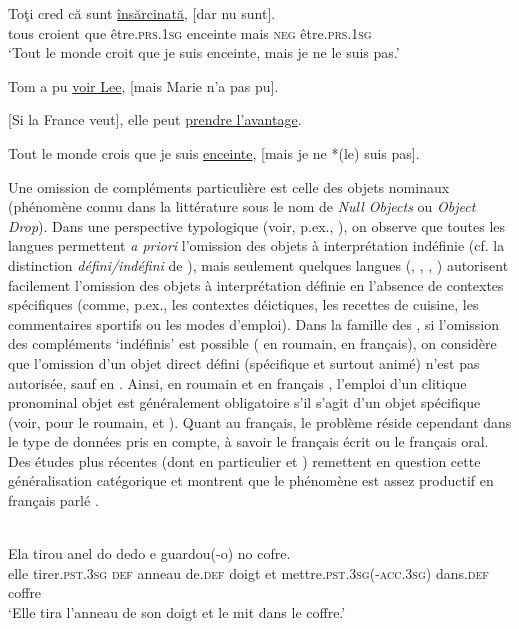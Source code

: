 \ex
\gll  Toţi  cred  că  sunt  \uline{însărcinată},  [dar  nu  sunt]. \label{ch1:ex63d}\\
  tous  croient  que  être.\textsc{prs.1sg}  enceinte  mais   \textsc{neg}  être.\textsc{prs.1sg} \\
\glt ‘Tout le monde croit que je suis enceinte, mais je ne le suis pas.’ 
\z
\z


\ea \label{ch1:ex64}
\ea  Tom a pu \uline{voir Lee}, [mais Marie n’a pas pu]. \citep{Dagnac2010}

\ex{} [Si la France veut], elle peut \uline{prendre l’avantage}. \citep{RigaudEtAl2014} 

\ex  Tout le monde crois que je suis \uline{enceinte}, [mais je ne *(le) suis pas]. \label{ch1:ex64c}
\z
\z

Une omission de compléments particulière est celle des objets nominaux (phé\-nomène connu dans la littérature sous le nom de \textit{Null Objects} ou \textit{Object Drop}). Dans une perspective typologique (voir, p.ex., \citealt{Huang1984}), on observe que toutes les langues permettent \textit{a priori} l’omission des objets à interprétation indéfinie (cf. la distinction \textit{défini/indéfini} de \citealt{Fillmore1986}), mais seulement quelques langues (, , , ) autorisent facilement l’omission des objets à interprétation définie en l’absence de contextes spécifiques (comme, p.ex., les contextes déictiques, les recettes de cuisine, les commentaires sportifs ou les modes d’emploi). Dans la famille des , si l’omission des compléments ‘indéfinis’ est possible ( en roumain,  en français), on considère que l’omission d’un objet direct défini (spécifique et surtout animé) n’est pas autorisée, sauf en  . Ainsi, en roumain  et en français , l’emploi d’un clitique pronominal objet est généralement obligatoire s’il s’agit d’un objet spécifique (voir, pour le roumain, \citealt{Ionescu2005} et \citealt{AvramEtAl2009}). Quant au français, le problème réside cependant dans le type de données pris en compte, à savoir le français écrit ou le français oral. Des études plus récentes (dont en particulier \citealt{LambrechtEtAl2005} et \citealt{CumminsEtAl2005}) remettent en question cette généralisation catégorique et montrent que le phénomène est assez productif en français parlé . 

\ea \label{ch1:ex65}
\\
\gll Ela  tirou   anel do  dedo  e  guardou(-o)  no cofre.\\
elle  tirer\textsc{.pst.3sg} \textsc{def}  anneau  de.\textsc{def}  doigt  et  mettre.\textsc{pst.3sg(-acc.3sg)}  dans.\textsc{def}  coffre  \\
\glt ‘Elle tira l’anneau de son doigt et le mit dans le coffre.’    
\z


